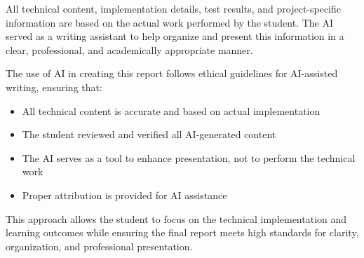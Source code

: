 \documentclass[12pt]{article}
\begin{document}
All technical content, implementation details, test results, and project-specific information are based on the actual work performed by the student. The AI served as a writing assistant to help organize and present this information in a clear, professional, and academically appropriate manner.

The use of AI in creating this report follows ethical guidelines for AI-assisted writing, ensuring that:
\begin{itemize}
    \item All technical content is accurate and based on actual implementation
    \item The student reviewed and verified all AI-generated content
    \item The AI serves as a tool to enhance presentation, not to perform the technical work
    \item Proper attribution is provided for AI assistance
\end{itemize}

This approach allows the student to focus on the technical implementation and learning outcomes while ensuring the final report meets high standards for clarity, organization, and professional presentation.
\end{document}
